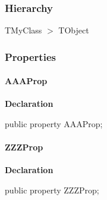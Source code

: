 \documentclass{report}
\begin{document}
\subsubsection*{\large{\textbf{Hierarchy}}\normalsize\hspace{1ex}\hfill}
TMyClass {$>$} TObject
\subsubsection*{\large{\textbf{Properties}}\normalsize\hspace{1ex}\hfill}
\paragraph*{AAAProp}\hspace*{\fill}

\begin{list}{}{
\setlength{\itemindent}{0cm}
\setlength{\listparindent}{0cm}
\setlength{\leftmargin}{\evensidemargin}
\addtolength{\leftmargin}{\tmplength}
\settowidth{\labelsep}{X}
\addtolength{\leftmargin}{\labelsep}
\setlength{\labelwidth}{\tmplength}
}
\begin{flushleft}
\item[\textbf{Declaration}\hfill]
\begin{ttfamily}
public property AAAProp;\end{ttfamily}


\end{flushleft}
\end{list}
\paragraph*{ZZZProp}\hspace*{\fill}

\begin{list}{}{
\setlength{\itemindent}{0cm}
\setlength{\listparindent}{0cm}
\setlength{\leftmargin}{\evensidemargin}
\addtolength{\leftmargin}{\tmplength}
\settowidth{\labelsep}{X}
\addtolength{\leftmargin}{\labelsep}
\setlength{\labelwidth}{\tmplength}
}
\begin{flushleft}
\item[\textbf{Declaration}\hfill]
\begin{ttfamily}
public property ZZZProp;\end{ttfamily}


\end{flushleft}
\end{list}
\end{document}
